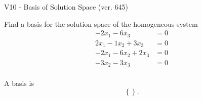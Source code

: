 \begin{exercise}
  \begin{exerciseTitle}V10 - Basis of Solution Space (ver. 645)\end{exerciseTitle}
  \begin{exerciseStatement}
    Find a basis for the solution space of the homogeneous system 
\begin{align*}
 -2 x_ 1 -6 x_ 3 &= 0  \\ 
  2 x_ 1 -1 x_ 2 + 3 x_ 3 &= 0  \\ 
  -2 x_ 1 -6 x_ 2 + 2 x_ 3 &= 0  \\ 
  -3 x_ 2 -3 x_ 3 &= 0  \\ 
 \end{align*}


 
  \end{exerciseStatement}

  \begin{exerciseAnswer}
   A basis is   
\[\left\{\right\}.\]

  


  \end{exerciseAnswer}
\end{exercise}